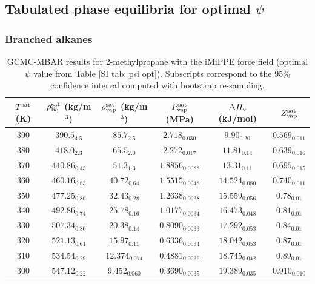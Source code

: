\documentclass[journal=jctc,manuscript=article]{achemso}
\begin{document}
\newpage
\clearpage

\subsection{Tabulated phase equilibria for optimal $\psi$}

\subsubsection{Branched alkanes}

\begin{table}[htb!]
	\caption{GCMC-MBAR results for 2-methylpropane with the iMiPPE force field (optimal $\psi$ value from Table \ref{SI tab: psi opt}). Subscripts correspond to the 95\% confidence interval computed with bootstrap re-sampling.}
	\begin{center}
		\begin{tabular}{|c|c|c|c|c|c|}
			\hline
			$T^{\rm sat}$ (K) & $\rho_{\rm liq}^{\rm sat}$ (kg/m$^3$) & $\rho_{\rm vap}^{\rm sat}$ (kg/m$^3$) & $P_{\rm vap}^{\rm sat}$ (MPa) & $\Delta H_{\rm v}$ (kJ/mol) & $Z_{\rm vap}^{\rm sat}$ \\ \hline
			390 & $390.5_{4.5}$ & $85.7_{2.5}$ & $2.718_{0.030}$ & $9.90_{0.20}$ & $0.569_{0.011}$ \\
			380 & $418.0_{2.3}$ & $65.5_{2.0}$ & $2.272_{0.017}$ & $11.81_{0.14}$ & $0.639_{0.016}$ \\
			370 & $440.86_{0.43}$ & $51.3_{1.3}$ & $1.8856_{0.0088}$ & $13.31_{0.11}$ & $0.695_{0.015}$ \\
			360 & $460.16_{0.83}$ & $40.72_{0.64}$ & $1.5515_{0.0048}$ & $14.524_{0.080}$ & $0.740_{0.011}$ \\
			350 & $477.25_{0.86}$ & $32.43_{0.28}$ & $1.2638_{0.0038}$ & $15.559_{0.056}$ & $0.78_{0.01}$ \\
			340 & $492.86_{0.74}$ & $25.78_{0.16}$ & $1.0177_{0.0034}$ & $16.473_{0.048}$ & $0.81_{0.01}$ \\
			330 & $507.34_{0.80}$ & $20.38_{0.14}$ & $0.8090_{0.0033}$ & $17.292_{0.053}$ & $0.84_{0.01}$ \\
			320 & $521.13_{0.61}$ & $15.97_{0.11}$ & $0.6336_{0.0034}$ & $18.042_{0.053}$ & $0.87_{0.01}$ \\
			310 & $534.54_{0.29}$ & $12.374_{0.074}$ & $0.4881_{0.0036}$ & $18.745_{0.042}$ & $0.89_{0.01}$ \\
			300 & $547.12_{0.22}$ & $9.452_{0.060}$ & $0.3690_{0.0035}$ & $19.389_{0.035}$ & $0.910_{0.010}$ \\

\end{tabular}
\end{center}
\end{table}
\end{document}
